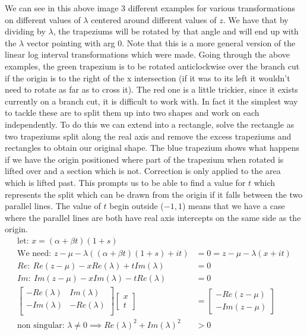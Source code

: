 \documentclass{article}
\begin{document}
We can see in this above image 3 different examples for various transformations on different values of $\lambda$ centered around different values of $z$.
We have that by dividing by $\lambda$, the trapeziums will be rotated by that angle and will end up with the $\lambda$ vector pointing with arg 0.
Note that this is a more general version of the linear log interval transformations which were made.
Going through the above examples, the green trapezium is to be rotated anticlockwise over the branch cut if the origin is to the right of the x intersection (if it was to its left it wouldn't need to rotate as far as to cross it).
The red one is a little trickier, since it exists currently on a branch cut, it is difficult to work with.
In fact it the simplest way to tackle these are to split them up into two shapes and work on each independently.
To do this we can extend into a rectangle, solve the rectangle as two trapeziums split along the real axis and remove the excess trapeziums and rectangles to obtain our original shape.
The blue trapezium shows what happens if we have the origin positioned where part of the trapezium when rotated is lifted over and a section which is not.
Correction is only applied to the area which is lifted past.
This prompts us to be able to find a value for $t$ which represents the split which can be drawn from the origin if it falls between the two parallel lines.
The value of $t$ begin outside ($-1,1$) means that we have a case where the parallel lines are both have real axis intercepts on the same side as the origin.
\begin{align}
    \text{let: }x=(\alpha+\beta t)(1+s)\\
    \text{We need: }z-\mu-\lambda((\alpha+\beta t)(1+s)+it)&=0=z-\mu-\lambda(x+it)\\
    Re:\:Re(z-\mu)-xRe(\lambda)+tIm(\lambda)&=0\\
    Im:\:Im(z-\mu)-xIm(\lambda)-tRe(\lambda)&=0\\
    \begin{bmatrix}
	-Re(\lambda)&Im(\lambda)\\
	-Im(\lambda)&-Re(\lambda)\\
    \end{bmatrix}
    \begin{bmatrix}x\\t\end{bmatrix}
    &=\begin{bmatrix}-Re(z-\mu)\\-Im(z-\mu)\end{bmatrix}\\
    \text{non singular: }\lambda\neq 0\implies Re(\lambda)^2+Im(\lambda)^2&>0
\end{align}
\end{document}
